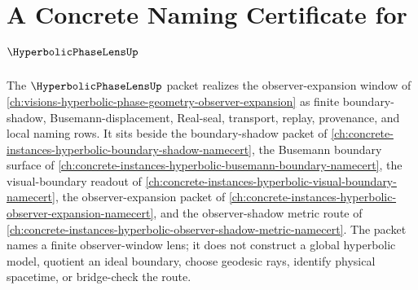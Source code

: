 \chapter{A Concrete Naming Certificate for $\HyperbolicPhaseLensUp$}
\label{ch:concrete-instances-hyperbolic-phase-lens-namecert}

The $\HyperbolicPhaseLensUp$ packet realizes the observer-expansion window of \autoref{ch:visions-hyperbolic-phase-geometry-observer-expansion} as finite boundary-shadow, Busemann-displacement, Real-seal, transport, replay, provenance, and local naming rows. It sits beside the boundary-shadow packet of \autoref{ch:concrete-instances-hyperbolic-boundary-shadow-namecert}, the Busemann boundary surface of \autoref{ch:concrete-instances-hyperbolic-busemann-boundary-namecert}, the visual-boundary readout of \autoref{ch:concrete-instances-hyperbolic-visual-boundary-namecert}, the observer-expansion packet of \autoref{ch:concrete-instances-hyperbolic-observer-expansion-namecert}, and the observer-shadow metric route of \autoref{ch:concrete-instances-hyperbolic-observer-shadow-metric-namecert}. The packet names a finite observer-window lens; it does not construct a global hyperbolic model, quotient an ideal boundary, choose geodesic rays, identify physical spacetime, or bridge-check the route.

